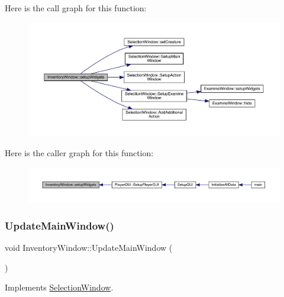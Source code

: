 Here is the call graph for this function\+:
\nopagebreak
\begin{figure}[H]
\begin{center}
\leavevmode
\includegraphics[width=350pt]{d1/dee/class_inventory_window_a0d286a4370871087af734042a3a6495d_cgraph}
\end{center}
\end{figure}
Here is the caller graph for this function\+:
\nopagebreak
\begin{figure}[H]
\begin{center}
\leavevmode
\includegraphics[width=350pt]{d1/dee/class_inventory_window_a0d286a4370871087af734042a3a6495d_icgraph}
\end{center}
\end{figure}
\mbox{\label{class_inventory_window_a02cf6a3724a6ca38f12de98b96e8a8e7}} 
\subsubsection{\texorpdfstring{Update\+Main\+Window()}{UpdateMainWindow()}}
{\footnotesize\ttfamily void Inventory\+Window\+::\+Update\+Main\+Window (\begin{DoxyParamCaption}{ }\end{DoxyParamCaption})\hspace{0.3cm}{\ttfamily [virtual]}}



Implements \mbox{\hyperlink{class_selection_window_a4ccb50fc06840c6c3966c89b1d991b03}{Selection\+Window}}.


